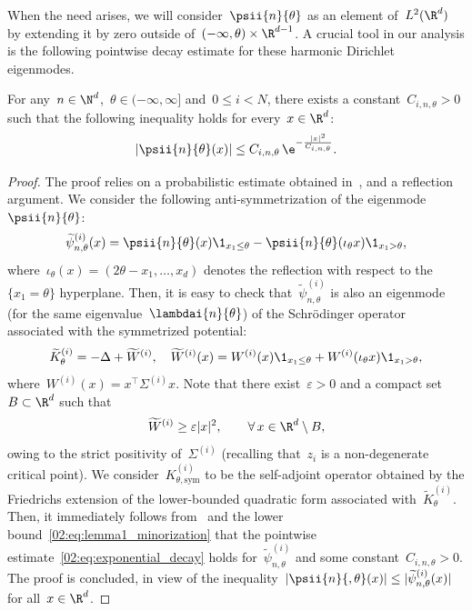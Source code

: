     When the need arises, we will consider~$\psii{n}{\theta}$ as an element of~$L^2(\R^d)$ by extending it by zero outside of~$(-\infty,\theta)\times\R^{d-1}$.
    A crucial tool in our analysis is the following pointwise decay estimate for these harmonic Dirichlet eigenmodes.
    \begin{lemma}
        For any~$n\in\N^d$,~$\theta\in(-\infty,\infty]$ and~$0\leq i< N$, there exists a constant~$C_{i,n,\theta}>0$ such that the following inequality holds for every~$x\in\R^d$:
        \begin{equation}
            \label{02:eq:exponential_decay}
            |\psii{n}{\theta}(x)| \leq C_{i,n,\theta}\,\e^{-\frac{|x|^2}{C_{i,n,\theta}}}.
        \end{equation}
    \end{lemma}
    \begin{proof}
        The proof relies on a probabilistic estimate obtained in~\cite{C78}, and a reflection argument.
        We consider the following anti-symmetrization of the eigenmode~$\psii{n}{\theta}$:
        \begin{equation}
            \widetilde{\psi}^{(i)}_{n,\theta}(x) = \psii{n}{\theta}(x)\1_{x_1\leq \theta} - \psii{n}{\theta}(\iota_\theta x)\1_{x_1>\theta},
        \end{equation}
        where~$\iota_\theta(x) = (2\theta-x_1,\dots,x_d)$ denotes the reflection with respect to the~$\{x_1 = \theta\}$ hyperplane. Then, it is easy to check that~$\widetilde{\psi}^{(i)}_{n,\theta}$
        is also an eigenmode (for the same eigenvalue~$\lambdai{n}{\theta}$) of the Schr\"odinger operator associated with the symmetrized potential:
        \begin{equation}
            \widetilde K^{(i)}_\theta = -\Delta + \widetilde W^{(i)} ,\quad \widetilde W^{(i)}(x) = W^{(i)}(x)\1_{x_1\leq \theta} + W^{(i)}(\iota_\theta x)\1_{x_1>\theta},
        \end{equation}
        where~$W^{(i)}(x)=x^\intercal \Sigma^{(i)}x$.
        Note that there exist~$\varepsilon>0$ and a compact set~$B\subset \R^d$ such that
        \begin{equation}
            \label{02:eq:lemma1_minorization}
            \widetilde W^{(i)} \geq \varepsilon|x|^2,\qquad \forall\,x\in \R^d\setminus B,
        \end{equation}
        owing to the strict positivity of~$\Sigma^{(i)}$ (recalling that~$z_i$ is a non-degenerate critical point).
        We consider~$K^{(i)}_{\theta,\mathrm{sym}}$ to be the self-adjoint operator obtained by the Friedrichs extension of the lower-bounded quadratic form associated with~$\widetilde K^{(i)}_\theta$.
        Then, it immediately follows from~\cite[Proposition 3.1]{C78} and the lower bound~\eqref{02:eq:lemma1_minorization} that the pointwise estimate~\eqref{02:eq:exponential_decay} holds for~$\widetilde\psi^{(i)}_{n,\theta}$ and some constant~$C_{i,n,\theta}>0$.
        The proof is concluded, in view of the inequality~$|\psii{n}{,\theta}(x)|\leq |\widetilde\psi^{(i)}_{n,\theta}(x)|$ for all~$x\in\R^d$.
    \end{proof}

